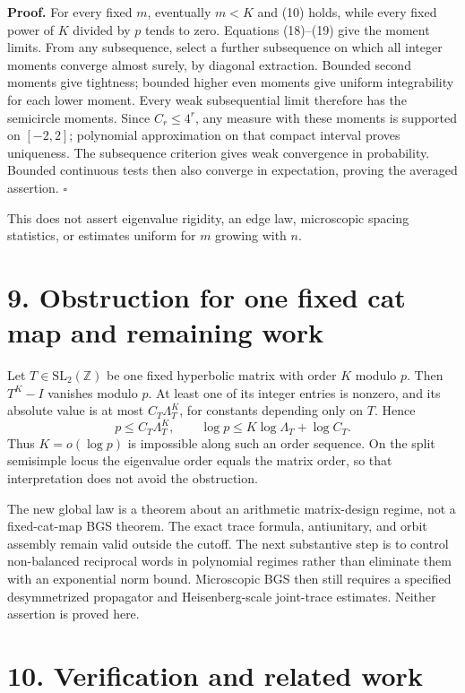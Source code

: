 \documentclass[
  11pt,
]{article}
\begin{document}
\textbf{Proof.} For every fixed \(m\), eventually \(m<K\) and (10)
holds, while every fixed power of \(K\) divided by \(p\) tends to zero.
Equations (18)--(19) give the moment limits. From any subsequence,
select a further subsequence on which all integer moments converge
almost surely, by diagonal extraction. Bounded second moments give
tightness; bounded higher even moments give uniform integrability for
each lower moment. Every weak subsequential limit therefore has the
semicircle moments. Since \(C_r\leq4^r\), any measure with these moments
is supported on \([-2,2]\); polynomial approximation on that compact
interval proves uniqueness. The subsequence criterion gives weak
convergence in probability. Bounded continuous tests then also converge
in expectation, proving the averaged assertion. \(\square\)

This does not assert eigenvalue rigidity, an edge law, microscopic
spacing statistics, or estimates uniform for \(m\) growing with \(n\).

\hypertarget{obstruction-for-one-fixed-cat-map-and-remaining-work}{%
\section{9. Obstruction for one fixed cat map and remaining
work}\label{obstruction-for-one-fixed-cat-map-and-remaining-work}}

Let \(T\in\mathrm{SL}_2(\mathbb Z)\) be one fixed hyperbolic matrix with
order \(K\) modulo \(p\). Then \(T^K-I\) vanishes modulo \(p\). At least
one of its integer entries is nonzero, and its absolute value is at most
\(C_T\Lambda_T^K\), for constants depending only on \(T\). Hence \[
 p\leq C_T\Lambda_T^K,\qquad
 \log p\leq K\log\Lambda_T+\log C_T. \tag{21}
\] Thus \(K=o(\log p)\) is impossible along such an order sequence. On
the split semisimple locus the eigenvalue order equals the matrix order,
so that interpretation does not avoid the obstruction.

The new global law is a theorem about an arithmetic matrix-design
regime, not a fixed-cat-map BGS theorem. The exact trace formula,
antiunitary, and orbit assembly remain valid outside the cutoff. The
next substantive step is to control non-balanced reciprocal words in
polynomial regimes rather than eliminate them with an exponential norm
bound. Microscopic BGS then still requires a specified desymmetrized
propagator and Heisenberg-scale joint-trace estimates. Neither assertion
is proved here.

\hypertarget{verification-and-related-work}{%
\section{10. Verification and related
work}\label{verification-and-related-work}}
\end{document}
